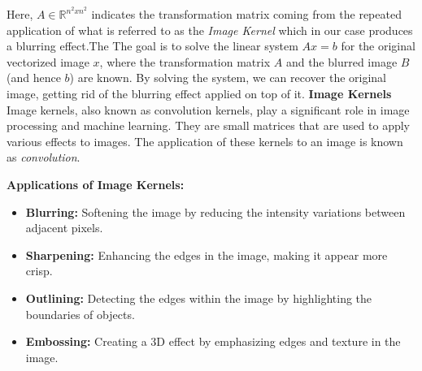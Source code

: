 \documentclass[unicode,11pt,a4paper,oneside,numbers=endperiod,openany]{scrartcl}
\begin{document}
                                                                                                                                                                                                                                                                                                                                                                                                                                                                                                                                                                                                                                                                                                                                                         Here, $A\in \mathbb{R}^{n^2xn^2}$ indicates the transformation matrix coming from the repeated application of what is referred to as the \textit{Image Kernel} which in our case produces a blurring effect.\newline The The goal is to solve the linear system $Ax=b$ for the original vectorized image $x$, where the transformation matrix $A$ and the blurred image $B$ (and hence $b$) are known. By solving the system, we can recover the original image, getting rid of the blurring effect applied on top of it.
                                                                                                                                                                                                                                                                \newline\newline\textbf{Image Kernels}
Image kernels, also known as convolution kernels, play a significant role in image processing and machine learning. They are small matrices that are used to apply various effects to images. The application of these kernels to an image is known as \textit{convolution}.

\textbf{Applications of Image Kernels:}
\begin{itemize}
    \item \textbf{Blurring:} Softening the image by reducing the intensity variations between adjacent pixels.
    \item \textbf{Sharpening:} Enhancing the edges in the image, making it appear more crisp.
    \item \textbf{Outlining:} Detecting the edges within the image by highlighting the boundaries of objects.
    \item \textbf{Embossing:} Creating a 3D effect by emphasizing edges and texture in the image.
\end{itemize}
\end{document}
